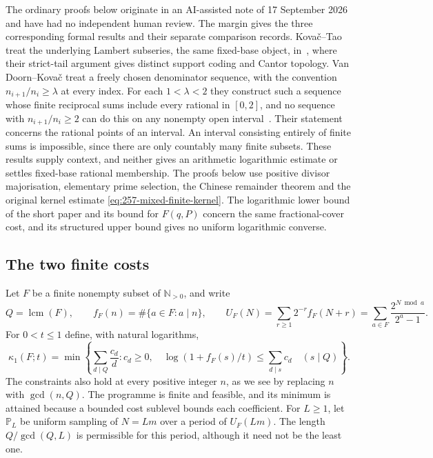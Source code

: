 \documentclass[11pt]{article}
\theoremstyle{plain}
\theoremstyle{definition}
\theoremstyle{remark}
\begin{document}
The ordinary proofs below originate in an AI-assisted note of 17 September
2026 and have had no independent human review. The margin gives the three
corresponding formal results and their separate comparison records.
Kova\v{c}--Tao treat the underlying Lambert subseries, the same fixed-base
object, in~\cite[Section~2.1.2 and Remark~4.1]{kovactao}, where their strict-tail
argument gives distinct support coding and Cantor topology.
Van Doorn--Kova\v{c} treat a freely chosen denominator sequence, with the
convention $n_{i+1}/n_i\ge\lambda$ at every index.
For each $1<\lambda<2$ they construct such a sequence whose finite
reciprocal sums include every rational in $[0,2]$, and no sequence with
$n_{i+1}/n_i\ge2$ can do this on any nonempty open
interval~\cite[Theorem~1, Lemma~4 and Corollary~5]{vandoornkovac}.
Their statement concerns the rational points of an interval. An interval
consisting entirely of finite sums is impossible, since there are
only countably many finite subsets.
These results supply context, and neither gives an arithmetic logarithmic
estimate or settles fixed-base rational membership.  The proofs below use
positive divisor majorisation, elementary prime selection, the Chinese
remainder theorem and the original kernel estimate
\eqref{eq:257-mixed-finite-kernel}.  The logarithmic lower bound of the short
paper and its bound for $F(q,P)$ concern the same fractional-cover cost, and
its structured upper bound gives no uniform logarithmic converse.

\subsection{The two finite costs}
Let $F$ be a finite nonempty subset of $\mathbb N_{>0}$, and write
\[
 Q=\operatorname{lcm}(F),\qquad f_F(n)=\#\{a\in F:a\mid n\},\qquad
 U_F(N)=\sum_{r\ge1}2^{-r}f_F(N+r)
       =\sum_{a\in F}\frac{2^{N\bmod a}}{2^a-1}.
\]
For $0<t\le1$ define, with natural logarithms,
\begin{equation}
 \kappa_1(F;t)=\min\left\{\sum_{d\mid Q}\frac{c_d}{d}:
 c_d\ge0,\quad
 \log(1+f_F(s)/t)\le\sum_{d\mid s}c_d\quad(s\mid Q)\right\}.
 \label{eq:257-logarithmic-cost}
\end{equation}
The constraints also hold at every positive integer $n$, as we see by replacing $n$
with $\gcd(n,Q)$.  The programme is finite and feasible, and its minimum is
attained because a bounded cost sublevel bounds each coefficient.
For $L\ge1$, let $\mathbb P_L$ be uniform sampling of $N=Lm$ over a
period of $U_F(Lm)$. The length $Q/\gcd(Q,L)$ is permissible for this period,
although it need not be the least one.
\end{document}
